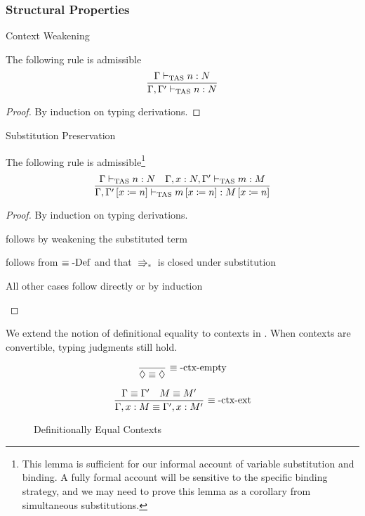 \subsubsection{Structural Properties}
 
\begin{thm}
Context Weakening
 
The following rule is admissible
\[
\frac{\Gamma\vdash_{\mathrm{TAS}} n:N}{\Gamma,\Gamma'\vdash_{\mathrm{TAS}} n:N}
\]
\end{thm}
 
\begin{proof}
By induction on typing derivations.
\end{proof}
\begin{lem}
Substitution Preservation
 
The following rule is admissible\footnote{
 This lemma is sufficient for our informal account of variable substitution and binding.
 A fully formal account will be sensitive to the specific binding strategy, and we may need to prove this lemma as a corollary from simultaneous substitutions.
}
\[
\frac{\Gamma\vdash_{\mathrm{TAS}} n:N\quad\Gamma,x:N,\Gamma'\vdash_{\mathrm{TAS}} m:M}{\Gamma,\Gamma'\left[x\coloneqq n\right]\vdash_{\mathrm{TAS}} m\left[x\coloneqq n\right]:M\left[x\coloneqq n\right]}
\]
\end{lem}
 
\begin{proof}
By induction on typing derivations.
 
\begin{casenv}
 \item {} follows by weakening the substituted term
 \item {} follows from $\equiv\operatorname{-Def}$ and that $\Rrightarrow_{\ast}$ is closed under substitution
 \item All other cases follow directly or by induction
\end{casenv}
\end{proof}

We extend the notion of definitional equality to contexts in .
When contexts are convertible, typing judgments still hold.
 
\begin{figure}
\[
\frac{\ }{\lozenge\equiv\lozenge}\,\rulename{\equiv-ctx-empty}
\]
 
\[
\frac{\Gamma\equiv\Gamma'\quad M\equiv M'}{\Gamma,x:M\equiv\Gamma',x:M'}\,\operatorname{\equiv-ctx-ext}
\]
 
\caption{Definitionally Equal Contexts}
\label{fig:surface-Context-Equiv}
\end{figure}
 

